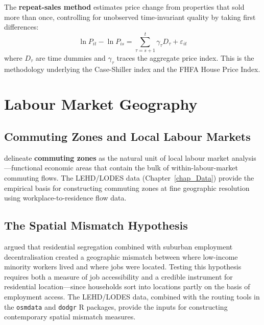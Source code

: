 The \textbf{repeat-sales method} \citep{Bailey1963,
Case1989} estimates price change from properties that sold more than once,
controlling for unobserved time-invariant quality by taking first differences:
\begin{equation}
  \ln P_{it} - \ln P_{is} = \sum_{\tau=s+1}^{t} \gamma_\tau D_\tau + \varepsilon_{it}
\end{equation}
where $D_\tau$ are time dummies and $\gamma_\tau$ traces the aggregate price
index. This is the methodology underlying the Case-Shiller index and the
FHFA House Price Index.



\section{Labour Market Geography}
\label{sec_LabourGeo}

\subsection{Commuting Zones and Local Labour Markets}

\citet{Autor2013} delineate \textbf{commuting zones}
as the natural unit of local labour market analysis---functional economic
areas that contain the bulk of within-labour-market commuting flows.
The LEHD/LODES data (Chapter~\ref{chap_Data}) provide the empirical basis
for constructing commuting zones at fine geographic resolution using
workplace-to-residence flow data.

\subsection{The Spatial Mismatch Hypothesis}

\citet{Kain1968} argued that residential segregation combined with suburban
employment decentralisation created a geographic mismatch between where
low-income minority workers lived and where jobs were located.
Testing this hypothesis requires both a measure of job accessibility and
a credible instrument for residential location---since households sort into
locations partly on the basis of employment access. The LEHD/LODES data,
combined with the routing tools in the \texttt{osmdata} and \texttt{dodgr}
R packages, provide the inputs for constructing contemporary spatial
mismatch measures.


\renewcommand\bibname{Further reading}
\begin{subappendices}


\end{subappendices}
